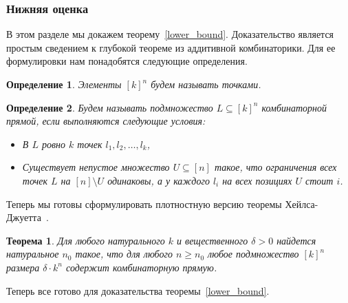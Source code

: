 \documentclass[12pt]{article}
\newtheorem{definition}{Определение}
\newtheorem{theorem}{Теорема}
\begin{document}
    \subsubsection{Нижняя оценка}
    \label{subsubsection_lower_bound}
    В этом разделе мы докажем теорему~\ref{lower_bound}.
    Доказательство является простым сведением к глубокой теореме из аддитивной комбинаторики. Для ее формулировки нам
    понадобятся следующие определения.

    \begin{definition}
        Элементы $[k]^n$ будем называть \emph{точками}.
    \end{definition}

    \begin{definition}
        Будем называть подмножество $L \subseteq [k]^n$ \emph{комбинаторной прямой},
        если выполняются следующие условия:
        \begin{itemize}
            \item В $L$ ровно $k$ точек $l_1, l_2, \ldots, l_k$,
            \item Существует непустое множество $U \subseteq [n]$ такое, что ограничения всех точек 
            $L$ на $[n] \setminus U$ одинаковы, а у каждого $l_i$ на всех позициях $U$ стоит $i$.
        \end{itemize}
    \end{definition}

    Теперь мы готовы сформулировать плотностную версию теоремы Хейлса-Джуетта~\cite{P09}.
    \begin{theorem}
        \label{density_hales_jewett}
        Для любого натурального $k$ и вещественного $\delta > 0$ найдется натуральное $n_0$ такое, что для
        любого $n \geq n_0$ любое подмножество $[k]^n$ размера $\delta \cdot k^n$ содержит комбинаторную
        прямую.
    \end{theorem}

    Теперь все готово для доказательства теоремы~\ref{lower_bound}.
\end{document}
